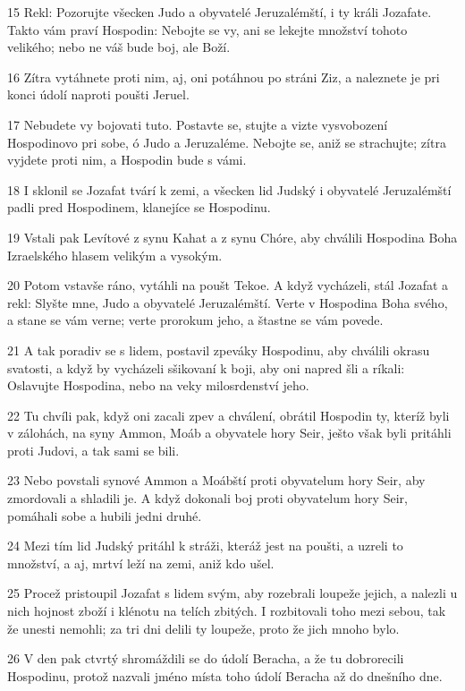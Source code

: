 \par 15 Rekl: Pozorujte všecken Judo a obyvatelé Jeruzalémští, i ty králi Jozafate. Takto vám praví Hospodin: Nebojte se vy, ani se lekejte množství tohoto velikého; nebo ne váš bude boj, ale Boží.
\par 16 Zítra vytáhnete proti nim, aj, oni potáhnou po stráni Ziz, a naleznete je pri konci údolí naproti poušti Jeruel.
\par 17 Nebudete vy bojovati tuto. Postavte se, stujte a vizte vysvobození Hospodinovo pri sobe, ó Judo a Jeruzaléme. Nebojte se, aniž se strachujte; zítra vyjdete proti nim, a Hospodin bude s vámi.
\par 18 I sklonil se Jozafat tvárí k zemi, a všecken lid Judský i obyvatelé Jeruzalémští padli pred Hospodinem, klanejíce se Hospodinu.
\par 19 Vstali pak Levítové z synu Kahat a z synu Chóre, aby chválili Hospodina Boha Izraelského hlasem velikým a vysokým.
\par 20 Potom vstavše ráno, vytáhli na poušt Tekoe. A když vycházeli, stál Jozafat a rekl: Slyšte mne, Judo a obyvatelé Jeruzalémští. Verte v Hospodina Boha svého, a stane se vám verne; verte prorokum jeho, a štastne se vám povede.
\par 21 A tak poradiv se s lidem, postavil zpeváky Hospodinu, aby chválili okrasu svatosti, a když by vycházeli sšikovaní k boji, aby oni napred šli a ríkali: Oslavujte Hospodina, nebo na veky milosrdenství jeho.
\par 22 Tu chvíli pak, když oni zacali zpev a chválení, obrátil Hospodin ty, kteríž byli v zálohách, na syny Ammon, Moáb a obyvatele hory Seir, ješto však byli pritáhli proti Judovi, a tak sami se bili.
\par 23 Nebo povstali synové Ammon a Moábští proti obyvatelum hory Seir, aby zmordovali a shladili je. A když dokonali boj proti obyvatelum hory Seir, pomáhali sobe a hubili jedni druhé.
\par 24 Mezi tím lid Judský pritáhl k stráži, kteráž jest na poušti, a uzreli to množství, a aj, mrtví leží na zemi, aniž kdo ušel.
\par 25 Procež pristoupil Jozafat s lidem svým, aby rozebrali loupeže jejich, a nalezli u nich hojnost zboží i klénotu na telích zbitých. I rozbitovali toho mezi sebou, tak že unesti nemohli; za tri dni delili ty loupeže, proto že jich mnoho bylo.
\par 26 V den pak ctvrtý shromáždili se do údolí Beracha, a že tu dobrorecili Hospodinu, protož nazvali jméno místa toho údolí Beracha až do dnešního dne.
